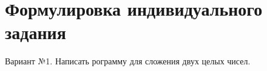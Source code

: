 \section{Формулировка индивидуального задания}

Вариант №1. Написать рограмму для сложения двух целых чисел.
